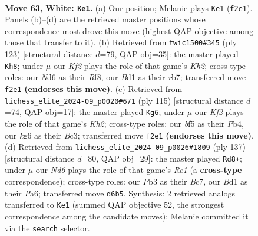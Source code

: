 \documentclass[11pt]{article}
\begin{document}
\clearpage

\begin{figure}[p]\centering
\begin{subfigure}{0.46\textwidth}\centering
\resizebox{\linewidth}{!}{%
\newchessgame
\chessboard[
  setfen={n7/3n4/1b1N2kB/p2p1b2/8/PP2P2p/4PK2/3B4 w - - 7 63},
  showmover=false,
  pgfstyle=straightmove, color=movearrow, markmove={f2-e1}
]}
\caption{}
\end{subfigure}\hfill
\begin{subfigure}{0.46\textwidth}\centering
\resizebox{\linewidth}{!}{%
\newchessgame
\chessboard[
  setfen={5r2/1R3Bpk/4Kb1p/4p2P/6P1/5P2/8/8 b - - 2 62},
  showmover=false,
  pgfstyle=straightmove, color=movearrow, markmove={h7-h8}
]}
\caption{}
\end{subfigure}
\\[4pt]
\begin{subfigure}{0.46\textwidth}\centering
\resizebox{\linewidth}{!}{%
\newchessgame
\chessboard[
  setfen={8/5ppk/4p2p/4P3/1p1B4/2b4P/2N2KP1/8 b - - 8 58},
  showmover=false,
  pgfstyle=straightmove, color=movearrow, markmove={h7-g6}
]}
\caption{}
\end{subfigure}\hfill
\begin{subfigure}{0.46\textwidth}\centering
\resizebox{\linewidth}{!}{%
\newchessgame
\chessboard[
  setfen={4r3/2b5/p1b3k1/5p2/p5p1/2P1B3/1P1KNP2/6R1 b - - 3 69},
  showmover=false,
  pgfstyle=straightmove, color=movearrow, markmove={e8-d8}
]}
\caption{}
\end{subfigure}
\caption{\textbf{Move 63, White: \texttt{Ke1}.} (a) Our position; Melanie plays \texttt{Ke1} (\texttt{f2e1}). Panels (b)--(d) are the retrieved master positions whose correspondence most drove this move (highest QAP objective among those that transfer to it). (b) Retrieved from \texttt{twic1500\#345} (ply 123) [structural distance $d$=79, QAP obj=35]: the master played \texttt{Kh8}; under $\mu$ our \emph{Kf2} plays the role of that game's \emph{Kh2}; cross-type roles: our \emph{N}d6 as their \emph{R}f8, our \emph{B}d1 as their \emph{r}b7; transferred move \texttt{f2e1} \textbf{(endorses this move)}. (c) Retrieved from \texttt{lichess\_elite\_2024-09\_p0020\#671} (ply 115) [structural distance $d$=74, QAP obj=17]: the master played \texttt{Kg6}; under $\mu$ our \emph{Kf2} plays the role of that game's \emph{Kh2}; cross-type roles: our \emph{b}f5 as their \emph{P}b4, our \emph{k}g6 as their \emph{B}c3; transferred move \texttt{f2e1} \textbf{(endorses this move)}. (d) Retrieved from \texttt{lichess\_elite\_2024-09\_p0026\#1809} (ply 137) [structural distance $d$=80, QAP obj=29]: the master played \texttt{Rd8+}; under $\mu$ our \emph{Nd6} plays the role of that game's \emph{Re1} (a \textbf{cross-type} correspondence); cross-type roles: our \emph{P}b3 as their \emph{B}c7, our \emph{B}d1 as their \emph{P}a6; transferred move \texttt{d6b5}. Synthesis: 2 retrieved analogs transferred to \texttt{Ke1} (summed QAP objective 52, the strongest correspondence among the candidate moves); Melanie committed it via the \texttt{search} selector.}
\label{fig:thought-m124}
\end{figure}
\end{document}
